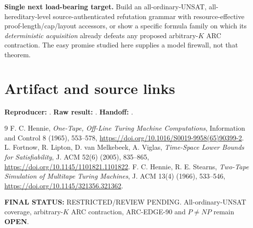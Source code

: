 \documentclass[11pt]{article}
\newcommand{\OPEN}{\textbf{OPEN}}
\begin{document}
\noindent\textbf{Single next load-bearing target.}
Build an all-ordinary-UNSAT, all-hereditary-level
source-authenticated refutation grammar with
resource-effective proof-length/cap/layout accessors,
or show a specific formula family on which its
\emph{deterministic acquisition} already defeats any
proposed arbitrary-$K$ ARC contraction.  The easy promise
studied here supplies a model firewall, not that theorem.

\section*{Artifact and source links}
\noindent\textbf{Reproducer:}
.
\textbf{Raw result:}
.
\textbf{Handoff:}
.

\begin{thebibliography}{9}
 F. C. Hennie,
\emph{One-Tape, Off-Line Turing Machine Computations},
Information and Control 8 (1965), 553--578,
\url{https://doi.org/10.1016/S0019-9958(65)90399-2}.
 L. Fortnow, R. Lipton, D. van Melkebeek, A. Viglas,
\emph{Time-Space Lower Bounds for Satisfiability},
J. ACM 52(6) (2005), 835--865,
\url{https://doi.org/10.1145/1101821.1101822}.
 F. C. Hennie, R. E. Stearns,
\emph{Two-Tape Simulation of Multitape Turing Machines},
J. ACM 13(4) (1966), 533--546,
\url{https://doi.org/10.1145/321356.321362}.
\end{thebibliography}

\noindent\textbf{FINAL STATUS:} RESTRICTED/REVIEW PENDING.
All-ordinary-UNSAT coverage, arbitrary-$K$ ARC contraction,
ARC-EDGE-90 and $P\ne NP$ remain \OPEN.

\end{document}
